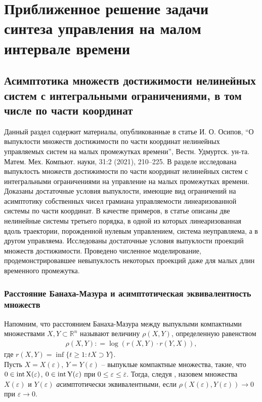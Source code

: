 \documentclass[../main.tex]{subfiles}
\begin{document}
\clearpage
\section{Приближенное решение задачи синтеза управления на малом интервале времени}
\subsection{Асимптотика множеств достижимости нелинейных систем с интегральными ограничениями, в том числе по части координат} 
Данный раздел содержит материалы, опубликованные в статье И. О. Осипов, “О выпуклости множеств достижимости по части координат нелинейных управляемых систем на малых промежутках времени”, Вестн. Удмуртск. ун-та. Матем. Мех. Компьют. науки, 31:2 (2021),  210–225. В разделе исследована выпуклость множеств достижимости по части координат нелинейных систем с интегральными ограничениями на управление на малых промежутках времени.
Доказаны достаточные условия выпуклости, имеющие вид ограничений на асимптотику собственных чисел грамиана управляемости линеаризованной системы по части координат.
В качестве примеров, в статье описаны две нелинейные системы третьего порядка, в одной из которых линеаризованная вдоль траектории, порожденной нулевым управлением, система неуправляема, а в другом управляема.
Исследованы достаточные условия выпуклости проекций множеств достижимости. 
Проведено численное моделирование, продемонстрировавшее невыпуклость некоторых проекций даже для малых длин временного промежутка.
\subsubsection{Расстояние Банаха-Мазура и асимптотическая эквивалентность множеств}
Напомним, что расстоянием Банаха-Мазура между выпуклыми компактными множествами $ X,Y \subset \mathbb R^n $ называют величину $ \rho (X, Y)  $, определенную равенством 
\begin{gather*}
	\rho (X, Y): = \log (r(X,Y) \cdot r(Y, X)),
\end{gather*}
где $r(X, Y) = \inf \{t \geq 1: tX \supset Y \}$.\\
Пусть $ X = X(\varepsilon) $,  $ Y = Y(\varepsilon) $ -- выпуклые компактные множества, такие, что $ 0 \in \rm{int}\,X(\varepsilon) $, $ 0 \in \rm{int}\,Y(\varepsilon) $ при $0 \leqslant \varepsilon \leqslant \overline{\varepsilon} $.  Тогда, следуя \cite{Ovs}, назовем множества $  X(\varepsilon)  $ и $  Y(\varepsilon) $ {\textit асимптотически эквивалентными}, если $  \rho (X(\varepsilon), Y(\varepsilon)) \rightarrow 0 $ при $\varepsilon \rightarrow 0 $.
\end{document}
